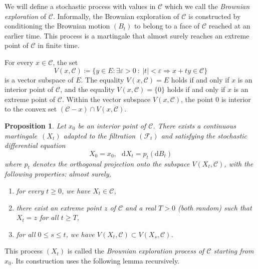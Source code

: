 \documentclass[10pt,a4paper]{amsart}
\newcommand{\e}{\varepsilon}
\renewcommand{\leq}{\leqslant}
\renewcommand{\geq}{\geqslant}
\newtheorem{proposition}{Proposition}
\begin{document}
\medskip
 
We will define a stochastic process with values in $\mathscr{C}$ which we call the \emph{Brownian exploration} of $\mathscr{C}$. Informally, the Brownian exploration of $\mathscr{C}$ is constructed by conditioning the Brownian motion $(B_t)$ to belong to a face of $\mathscr{C}$ reached at an earlier time. This process is a martingale that almost surely reaches an extreme point of $\mathscr{C}$ in finite time.
 
\medskip
 
For every $x \in \mathscr{C}$, the set
\begin{equation}
\label{eq:defVxC}
V(x,\mathscr{C}) \coloneqq \{ y \in E : \exists \e > 0 \ : \ |t| < \e \Longrightarrow x+ty \in \mathscr{C} \} \end{equation}
is a vector subspace of $E$. The equality $V(x,\mathscr{C})=E$ holds if and only if $x$ is an interior point of $\mathscr{C}$, and the equality $V(x,\mathscr{C})=\{0\}$ holds if and only if $x$ is an extreme point of $\mathscr{C}$. Within the vector subspace $V(x,\mathscr{C})$, the point $0$ is interior to the convex set $(\mathscr{C}-x) \cap V(x,\mathscr{C})$.
 
\medskip
 
\begin{proposition} \label{prop:exploration}
Let $x_0$ be an interior point of $\mathscr{C}$. There exists a continuous martingale~$(X_t)$ adapted to the filtration $(\mathcal{F}_t)$ and satisfying the stochastic differential equation
\begin{equation} \label{eq:EPDS} X_0 = x_0,  \ \ \ \mathrm{d}X_t = p_t(\mathrm{d}B_t)\end{equation}
where $p_t$ denotes the orthogonal projection onto the subspace $V(X_t,\mathscr{C})$, with the following properties: almost surely,
\begin{enumerate}
\item[(a)] for every $t \geq 0$, we have $X_t \in \mathscr{C}$,
\item[(b)] there exist an extreme point $z$ of $\mathscr{C}$ and a real $T >0$ \textup{(}both random\textup{)} such that $X_t=z$ for all $t \geq T$,
\item[(c)] for all $0 \leq s \leq t$, we have  $V(X_t,\mathscr{C}) \subset V(X_s,\mathscr{C})$.
\end{enumerate}
\end{proposition}
 
This process $(X_t)$ is called the \emph{Brownian exploration process of $\mathscr{C}$ starting from $x_0$}. Its construction uses the following lemma recursively.
 
\end{document}
